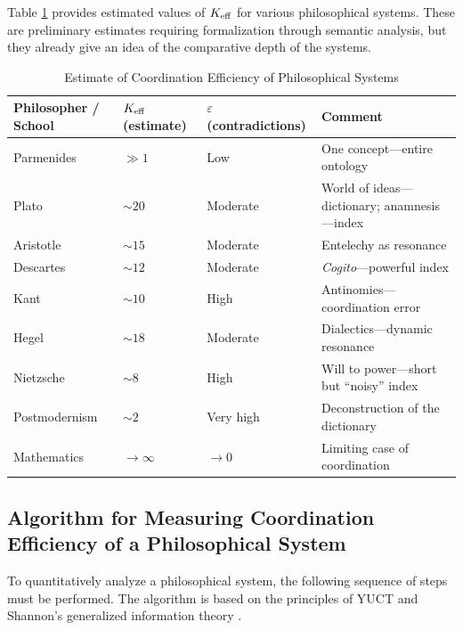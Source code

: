 \documentclass[12pt,a4paper]{article}
\newcommand{\eps}{\varepsilon}
\begin{document}
	Table \ref{tab:keff-examples} provides estimated values of \(\Keff\) for various philosophical systems. These are preliminary estimates requiring formalization through semantic analysis, but they already give an idea of the comparative depth of the systems.
	
	\begin{table}[H]
		\centering
		\caption{Estimate of Coordination Efficiency of Philosophical Systems}
		\label{tab:keff-examples}
		\begin{tabular}{p{3.5cm}p{3.5cm}p{3.5cm}p{3.5cm}}
			\toprule
			\textbf{Philosopher / School} & \(\Keff\) (estimate) & \(\eps\) (contradictions) & \textbf{Comment} \\
			\midrule
			Parmenides & \(\gg 1\) & Low & One concept—entire ontology \\
			Plato & \(\sim 20\) & Moderate & World of ideas—dictionary; anamnesis—index \\
			Aristotle & \(\sim 15\) & Moderate & Entelechy as resonance \\
			Descartes & \(\sim 12\) & Moderate & \textit{Cogito}—powerful index \\
			Kant & \(\sim 10\) & High & Antinomies—coordination error \\
			Hegel & \(\sim 18\) & Moderate & Dialectics—dynamic resonance \\
			Nietzsche & \(\sim 8\) & High & Will to power—short but ``noisy'' index \\
			Postmodernism & \(\sim 2\) & Very high & Deconstruction of the dictionary \\
			Mathematics & \(\to \infty\) & \(\to 0\) & Limiting case of coordination \\
			\bottomrule
		\end{tabular}
	\end{table}
	
	\subsection{Algorithm for Measuring Coordination Efficiency of a Philosophical System}
	\label{subsec:measurement-algorithm}
	
	To quantitatively analyze a philosophical system, the following sequence of steps must be performed. The algorithm is based on the principles of YUCT and Shannon's generalized information theory \cite{AppendixX}.
	
\end{document}
